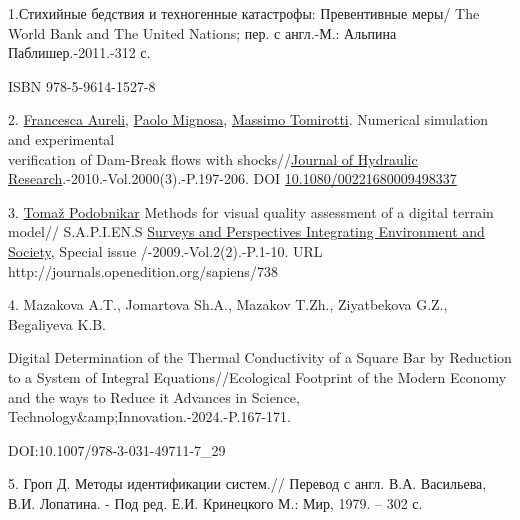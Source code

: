 \begin{references}
1.Стихийные бедствия и техногенные катастрофы: Превентивные меры/ The
World Bank and The United Nations; пер. с англ.-М.: Альпина
Паблишер.-2011.-312 с.

ISBN 978-5-9614-1527-8

2.
\href{https://www.researchgate.net/profile/Francesca-Aureli?_tp=eyJjb250ZXh0Ijp7ImZpcnN0UGFnZSI6InB1YmxpY2F0aW9uIiwicGFnZSI6InB1YmxpY2F0aW9uIn19}{Francesca
Aureli},
\href{https://www.researchgate.net/profile/Paolo-Mignosa?_tp=eyJjb250ZXh0Ijp7ImZpcnN0UGFnZSI6InB1YmxpY2F0aW9uIiwicGFnZSI6InB1YmxpY2F0aW9uIn19}{Paolo
Mignosa},
\href{https://www.researchgate.net/profile/Massimo-Tomirotti?_tp=eyJjb250ZXh0Ijp7ImZpcnN0UGFnZSI6InB1YmxpY2F0aW9uIiwicGFnZSI6InB1YmxpY2F0aW9uIn19}{Massimo
Tomirotti}. Numerical simulation and experimental \\verification of
Dam-Break flows with
shocks//\href{https://www.researchgate.net/journal/Journal-of-Hydraulic-Research-1814-2079?_tp=eyJjb250ZXh0Ijp7ImZpcnN0UGFnZSI6InB1YmxpY2F0aW9uIiwicGFnZSI6InB1YmxpY2F0aW9uIn19}{Journal
of Hydraulic Research}.-2010.-Vol.2000(3).-P.197-206. DOI
\href{http://dx.doi.org/10.1080/00221680009498337}{10.1080/00221680009498337}

3.
\href{https://www.researchgate.net/profile/Tomaz-Podobnikar?_tp=eyJjb250ZXh0Ijp7ImZpcnN0UGFnZSI6InB1YmxpY2F0aW9uIiwicGFnZSI6InB1YmxpY2F0aW9uIn19}{Tomaž
Podobnikar} Methods for visual quality assessment of a digital terrain
model// S.A.P.I.EN.S
\href{https://www.researchgate.net/journal/Surveys-and-Perspectives-Integrating-Environment-and-Society-1993-3819?_tp=eyJjb250ZXh0Ijp7ImZpcnN0UGFnZSI6InB1YmxpY2F0aW9uIiwicGFnZSI6InB1YmxpY2F0aW9uIn19}{Surveys
and Perspectives Integrating Environment and Society}, Special issue
/-2009.-Vol.2(2).-P.1-10. URL
http://journals.openedition.org/sapiens/738

4. Mazakova A.T., Jomartova Sh.A., Mazakov T.Zh., Ziyatbekova G.Z.,
Begaliyeva K.B.

Digital Determination of the Thermal Conductivity of a Square Bar by
Reduction to a System of Integral Equations//Ecological Footprint of the
Modern Economy and the ways to Reduce it Advances in Science,
Technology\&amp;Innovation.-2024.-P.167-171.

DOI:10.1007/978-3-031-49711-7\_29

5. Гроп Д. Методы идентификации систем.// Перевод с англ. В.А.
Васильева, В.И. Лопатина. - Под ред. Е.И. Кринецкого М.: Мир, 1979. --
302 с.
\end{references}

